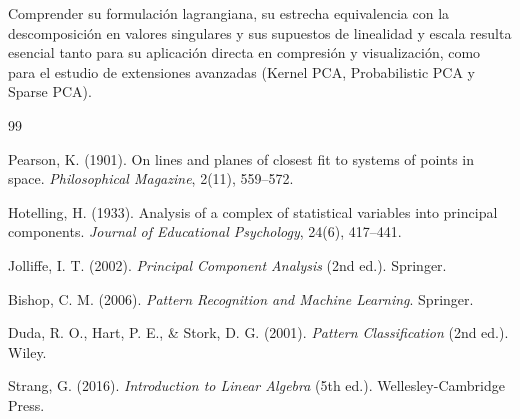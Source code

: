 \documentclass[11pt,letterpaper]{article}
\begin{document}
	Comprender su formulación lagrangiana, su estrecha equivalencia con la descomposición en valores singulares y sus supuestos de linealidad y escala resulta esencial tanto para su aplicación directa en compresión y visualización, como para el estudio de extensiones avanzadas (Kernel PCA, Probabilistic PCA y Sparse PCA).
	
	\newpage
	\renewcommand{\refname}{Bibliografía}
	\begin{thebibliography}{99}
		
		 Pearson, K. (1901). On lines and planes of closest fit to systems of points in space. \textit{Philosophical Magazine}, 2(11), 559--572.
		
		 Hotelling, H. (1933). Analysis of a complex of statistical variables into principal components. \textit{Journal of Educational Psychology}, 24(6), 417--441.
		
		 Jolliffe, I. T. (2002). \textit{Principal Component Analysis} (2nd ed.). Springer.
		
		 Bishop, C. M. (2006). \textit{Pattern Recognition and Machine Learning}. Springer.
		
		 Duda, R. O., Hart, P. E., \& Stork, D. G. (2001). \textit{Pattern Classification} (2nd ed.). Wiley.
		
		 Strang, G. (2016). \textit{Introduction to Linear Algebra} (5th ed.). Wellesley-Cambridge Press.
		
	\end{thebibliography}
	
\end{document}
